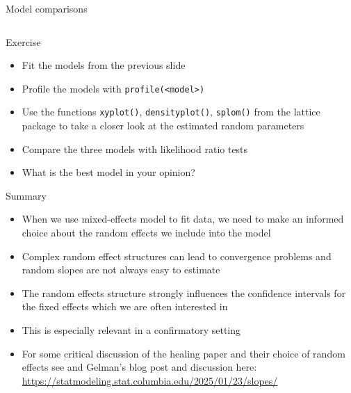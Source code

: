 \documentclass[aspectratio=169]{beamer}
\begin{document}
\begin{frame}[fragile]{Model comparisons}
\begin{columns}
\begin{column}{.35\textwidth}
    \end{column}
  \end{columns}
\end{frame}

\begin{frame}[fragile]{}
  \begin{block}{Exercise}
    \begin{itemize}
      \item Fit the models from the previous slide
      \item Profile the models with \texttt{profile(<model>)}
      \item Use the functions \texttt{xyplot()}, \texttt{densityplot()},
        \texttt{splom()} from the lattice package to take a closer look at the
        estimated random parameters
      \item Compare the three models with likelihood ratio tests
      \item What is the best model in your opinion?
    \end{itemize}
  \end{block}
\end{frame}

\begin{frame}[<+->]{Summary}
  \begin{itemize}
    \item When we use mixed-effects model to fit data, we need to make an
      informed choice about the random effects we include into the model
    \item Complex random effect structures can lead to convergence problems and
      random slopes are not always easy to estimate
    \item The random effects structure strongly influences the confidence
      intervals for the fixed effects which we are often interested in
    \item This is especially relevant in a confirmatory setting
    \item For some critical discussion of the healing paper and their choice of
      random effects see \citet{Gelman2024} and Gelman's blog post and
      discussion here:
      \url{https://statmodeling.stat.columbia.edu/2025/01/23/slopes/}
  \end{itemize}
\end{frame}
\end{document}
